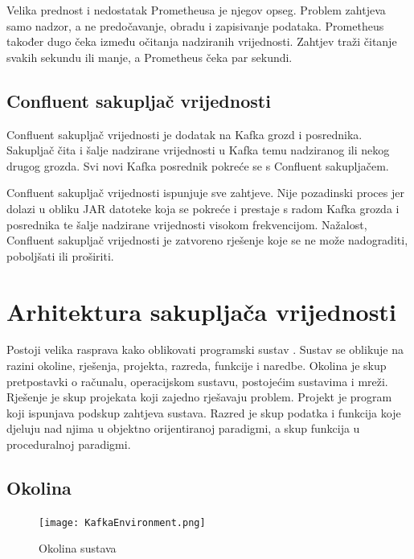 \documentclass[utf8, diplomski, lmodern, numeric]{fer}
\begin{document}
Velika prednost i nedostatak Prometheusa je njegov opseg. Problem zahtjeva samo nadzor, a ne predočavanje, obradu i zapisivanje podataka. Prometheus također dugo čeka između očitanja nadziranih vrijednosti. Zahtjev traži čitanje svakih sekundu ili manje, a Prometheus čeka par sekundi.


\section{Confluent sakupljač vrijednosti}

Confluent sakupljač vrijednosti \citep{confluent-metrics-reporter} je dodatak na Kafka grozd i posrednika. Sakupljač čita i šalje nadzirane vrijednosti u Kafka temu nadziranog ili nekog drugog grozda. Svi novi Kafka posrednik pokreće se s Confluent sakupljačem.

Confluent sakupljač vrijednosti ispunjuje sve zahtjeve. Nije pozadinski proces jer dolazi u obliku JAR datoteke koja se pokreće i prestaje s radom Kafka grozda i posrednika te šalje nadzirane vrijednosti visokom frekvencijom. Nažalost, Confluent sakupljač vrijednosti je zatvoreno rješenje koje se ne može nadograditi, poboljšati ili proširiti.



\chapter{Arhitektura sakupljača vrijednosti}

Postoji velika rasprava kako oblikovati programski sustav \citep{clean-code} \citep{code-complete}. Sustav se oblikuje na razini okoline, rješenja, projekta, razreda, funkcije i naredbe. Okolina je skup pretpostavki o računalu, operacijskom sustavu, postojećim sustavima i mreži. Rješenje je skup projekata koji zajedno rješavaju problem. Projekt je program koji ispunjava podskup zahtjeva sustava. Razred je skup podatka i funkcija koje djeluju nad njima u objektno orijentiranoj paradigmi, a skup funkcija u proceduralnoj paradigmi.


\section{Okolina}

\begin{figure}[H]
    \centering
    \texttt{[image: KafkaEnvironment.png]}
    \caption{Okolina sustava}
    \label{fig:kafka-environment}
\end{figure}
\end{document}
